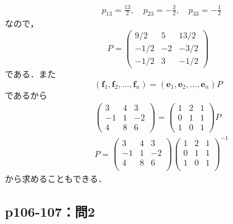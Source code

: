 \documentclass[uplatex,dvipdfmx,a4paper,10pt,fleqn]{jsarticle}
\begin{document}
\begin{leftbar}
\begin{align*}
&p_{13}=\frac{13}{2},\quad p_{23}=-\frac{3}{2},\quad p_{33}=-\frac{1}{2}
\end{align*} 
なので，
\[
P=
\begin{pmatrix}
9/2 & 5  & 13/2 \\
-1/2 & -2 & -3/2 \\
-1/2 & 3 & -1/2
\end{pmatrix}
\]
である．また
\begin{equation*}
(\bm{f}_1,\bm{f}_2,\ldots ,\bm{f}_n)=(\bm{e}_1,\bm{e}_2,\ldots ,\bm{e}_n)P
\end{equation*}
であるから
\begin{align*}
    &
\begin{pmatrix}
3 & 4 & 3 \\
-1 & 1 & -2 \\
4 & 8 & 6 
\end{pmatrix}
=
\begin{pmatrix}
1 & 2 & 1 \\
0 & 1 & 1 \\
1 & 0 & 1 
\end{pmatrix}
P \\ 
&P=
\begin{pmatrix}
3 & 4 & 3 \\
-1 & 1 & -2 \\
4 & 8 & 6 \\
\end{pmatrix}
\begin{pmatrix}
1 & 2 & 1 \\
0 & 1 & 1 \\
1 & 0 & 1 \\
\end{pmatrix}
^{-1}
\end{align*}
から求めることもできる．
\end{leftbar}

\newpage 

\subsection*{p106-107：問2}
\end{document}
